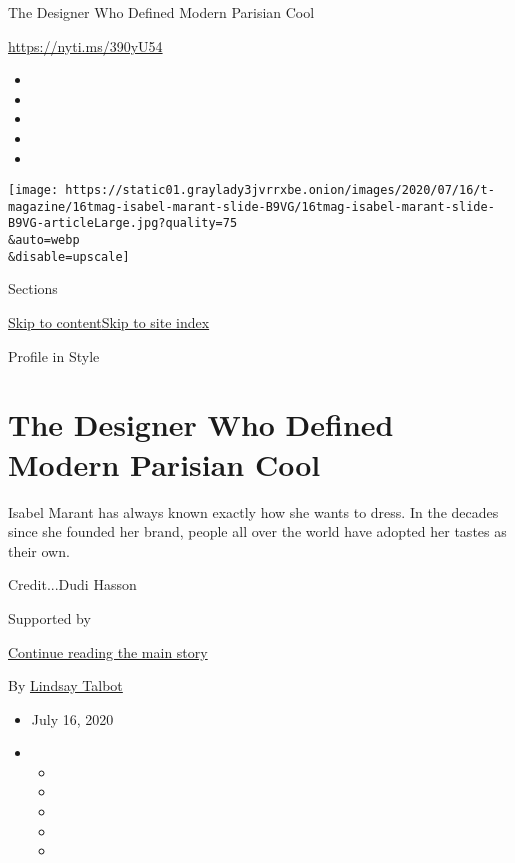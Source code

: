 The Designer Who Defined Modern Parisian Cool

\url{https://nyti.ms/390yU54}

\begin{itemize}
\item
\item
\item
\item
\item
\end{itemize}

\texttt{[image: https://static01.graylady3jvrrxbe.onion/images/2020/07/16/t-magazine/16tmag-isabel-marant-slide-B9VG/16tmag-isabel-marant-slide-B9VG-articleLarge.jpg?quality=75\\\&auto=webp\\\&disable=upscale]}

Sections

\protect\hyperlink{site-content}{Skip to
content}\protect\hyperlink{site-index}{Skip to site index}

Profile in Style

\hypertarget{the-designer-who-defined-modern-parisian-cool}{%
\section{The Designer Who Defined Modern Parisian
Cool}\label{the-designer-who-defined-modern-parisian-cool}}

Isabel Marant has always known exactly how she wants to dress. In the
decades since she founded her brand, people all over the world have
adopted her tastes as their own.

Credit...Dudi Hasson

Supported by

\protect\hyperlink{after-sponsor}{Continue reading the main story}

By \href{https://www.nytimes3xbfgragh.onion/by/lindsay-talbot}{Lindsay
Talbot}

\begin{itemize}
\item
  July 16, 2020
\item
  \begin{itemize}
  \item
  \item
  \item
  \item
  \item
  \end{itemize}
\end{itemize}


